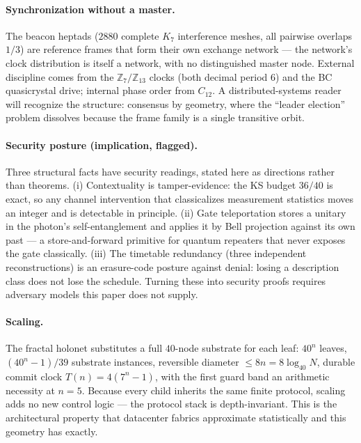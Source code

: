 \documentclass[11pt]{article}
\begin{document}
\paragraph{Synchronization without a master.}  The beacon heptads
($2880$ complete $K_7$ interference meshes, all pairwise overlaps
$1/3$) are reference frames that form their own exchange network ---
the network's clock distribution is itself a network, with no
distinguished master node.  External discipline comes from the
$\mathbb{Z}_7/\mathbb{Z}_{13}$ clocks (both decimal period $6$) and
the BC quasicrystal drive; internal phase order from $C_{12}$.  A
distributed-systems reader will recognize the structure: consensus
by geometry, where the ``leader election'' problem dissolves because
the frame family is a single transitive orbit.

\paragraph{Security posture (implication, flagged).}  Three
structural facts have security readings, stated here as directions
rather than theorems.  (i) Contextuality is tamper-evidence: the KS
budget $36/40$ is exact, so any channel intervention that classicalizes
measurement statistics moves an integer and is detectable in
principle.  (ii) Gate teleportation stores a unitary in the photon's
self-entanglement and applies it by Bell projection against its own
past --- a store-and-forward primitive for quantum repeaters that
never exposes the gate classically.  (iii) The timetable redundancy
(three independent reconstructions) is an erasure-code posture
against denial: losing a description class does not lose the
schedule.  Turning these into security proofs requires adversary
models this paper does not supply.

\paragraph{Scaling.}  The fractal holonet substitutes a full
$40$-node substrate for each leaf: $40^n$ leaves, $(40^n-1)/39$
substrate instances, reversible diameter $\le 8n = 8\log_{40}N$,
durable commit clock $T(n)=4(7^n-1)$, with the first guard band an
arithmetic necessity at $n=5$.  Because every child inherits the
same finite protocol, scaling adds no new control logic --- the
protocol stack is depth-invariant.  This is the architectural
property that datacenter fabrics approximate statistically and this
geometry has exactly.
\end{document}

